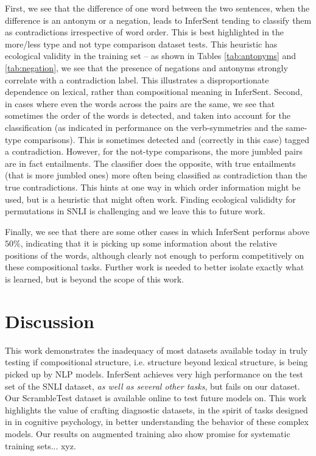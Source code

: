 \documentclass[10pt,letterpaper]{article}
\begin{document}
First, we see that the difference of one word between the two sentences, when the difference is an antonym or a negation, leads to InferSent tending to classify them as contradictions irrespective of word order. This is best highlighted in the more/less type and not type comparison dataset tests. This heuristic has ecological validity in the training set – as shown in Tables \ref{tab:antonyms} and \ref{tab:negation}, we see that the presence of negations and antonyms strongly correlate with a contradiction label. This illustrates a disproportionate dependence on lexical, rather than compositional meaning in InferSent. 
Second, in cases where even the words across the pairs are the same, we see that sometimes the order of the words is detected, and taken into account for the classification (as indicated in performance on the verb-symmetries and the same-type comparisons). This is sometimes detected and (correctly in this case) tagged a contradiction. However, for the not-type comparisons, the more jumbled pairs are in fact entailments. The classifier does the opposite, with true entailments (that is more jumbled ones) more often being classified as contradiction than the true contradictions. This hints at one way in which order information might be used, but is a heuristic that might often work. Finding ecological valididty for permutations in SNLI is challenging and we leave this to future work.

Finally, we see that there are some other cases in which InferSent performs above $50\%$, indicating that it is picking up some information about the relative positions of the words, although clearly not enough to perform competitively on these compositional tasks. Further work is needed to better isolate exactly what is learned, but is beyond the scope of this work.

\section{Discussion}

This work demonstrates the inadequacy of most datasets available today in truly testing if compositional structure, i.e. structure beyond lexical structure, is being picked up by NLP models. InferSent achieves very high performance on the test set of the SNLI dataset, \textit{as well as several other tasks}, but fails on our dataset. Our ScrambleTest dataset is available online to test future models on. This work highlights the value of crafting diagnostic datasets, in the spirit of tasks designed in in cognitive psychology, in better understanding the behavior of these complex models. Our results on augmented training also show promise for systematic training sets... xyz.
\end{document}
